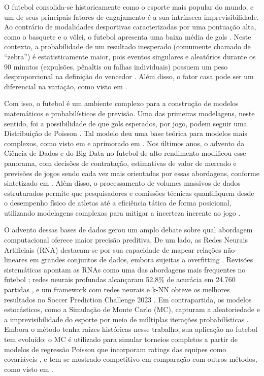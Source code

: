 \documentclass[12pt]{article}
\begin{document}
O futebol consolida-se historicamente como o esporte mais popular do mundo, e um de seus principais fatores de engajamento é a sua intrínseca imprevisibilidade. Ao contrário de modalidades desportivas caracterizadas por uma pontuação alta, como o basquete e o vôlei, o futebol apresenta uma baixa média de gols \cite{anderson2013, bandara2024winning}. Neste contexto, a probabilidade de um resultado inesperado (comumente chamado de ``zebra'') é estatisticamente maior, pois eventos singulares e aleatórios durante os 90 minutos (expulsões, pênaltis ou falhas individuais) possuem um peso desproporcional na definição do vencedor \cite{sumpter2016}. Além disso, o fator casa pode ser um diferencial na variação, como visto em \cite{chacon2025home}.

Com isso, o futebol é um ambiente complexo para a construção de modelos matemáticos e probabilísticos de previsão. Uma das primeiras modelagens, neste sentido, foi a possibilidade de que gols esperados, por jogo, podem seguir uma Distribuição de Poisson \cite{moroney1956facts}. Tal modelo deu uma base teórica para modelos mais complexos, como visto em \cite{maher1982} e aprimorado em \cite{dixon1997}. Nos últimos anos, o advento da Ciência de Dados e do Big Data no futebol de alto rendimento modificou esse panorama, com decisões de contratação, estimativas de valor de mercado e previsões de jogos sendo cada vez mais orientadas por essas abordagens, conforme sintetizado em \cite{klaiber2026uncovering}.  Além disso, o processamento de volumes massivos de dados estruturados permite que pesquisadores e comissões técnicas quantifiquem desde o desempenho físico de atletas até a eficiência tática de forma posicional, utilizando modelagens complexas para mitigar a incerteza inerente ao jogo \cite{memmert2018}. 

O advento dessas bases de dados gerou um amplo debate sobre qual abordagem computacional oferece maior precisão preditiva. De um lado, as Redes Neurais Artificiais (RNA) destacam-se por sua capacidade de mapear relações não-lineares em grandes conjuntos de dados, embora sujeitas a overfitting \cite{goodfellow2016}. Revisões sistemáticas apontam as RNAs como uma das abordagens mais frequentes no futebol \cite{elstak2024artificial}; redes neurais profundas alcançaram 52,8\% de acurácia em 24.760 partidas \cite{luiz2024football}, e um framework com redes neurais e k-NN obteve os melhores resultados no Soccer Prediction Challenge 2023 \cite{berrar2024data}. Em contrapartida, os modelos estocásticos, como a Simulação de Monte Carlo (MC), capturam a aleatoriedade e a imprevisibilidade do esporte por meio de múltiplas iterações probabilísticas \cite{metropolis1949}. Embora o método tenha raízes históricas nesse trabalho, sua aplicação no futebol tem evoluído: o MC é utilizado para simular torneios completos a partir de modelos de regressão Poisson que incorporam ratings das equipes como covariáveis \cite{lopez2022elo}, e tem se mostrado competitivo em comparação com outros métodos, como visto em \cite{pal2025evaluating}.
\end{document}
